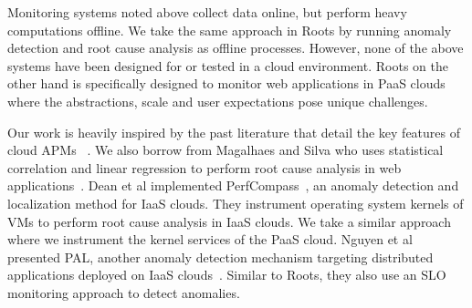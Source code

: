 Monitoring systems noted above collect data online, but perform heavy computations
offline. We take the same approach in Roots by running anomaly detection
and root cause analysis as offline processes. However, none of the above
systems have been designed for or tested in a cloud environment. Roots on
the other hand is specifically designed to monitor web applications in
PaaS clouds where the abstractions, scale and user expectations pose unique challenges.

Our work is heavily inspired by the past literature that detail the key features of 
cloud APMs~\cite{DaCunhaRodrigues:2016:MCC:2851613.2851619,Ibidunmoye:2015:PAD:2808687.2791120} . 
We also borrow from
Magalhaes and Silva who uses statistical correlation and linear regression to perform
root cause analysis in web applications~\cite{Magalhaes:2010:DPA:1906485.1906774, Magalhaes:2011:RAP:1982185.1982234}. 
Dean et al implemented PerfCompass~\cite{Dean:2014:PTR:2696535.2696551}, 
an anomaly detection and localization method for IaaS clouds. They instrument operating system kernels
of VMs to perform root cause analysis in IaaS clouds. We take a similar approach where we instrument
the kernel services of the PaaS cloud.
Nguyen et al presented PAL, another anomaly detection mechanism targeting
distributed applications deployed on IaaS clouds~\cite{Nguyen:2011:PPR:2038633.2038634}. 
Similar to Roots, they also use an SLO monitoring approach to detect anomalies.